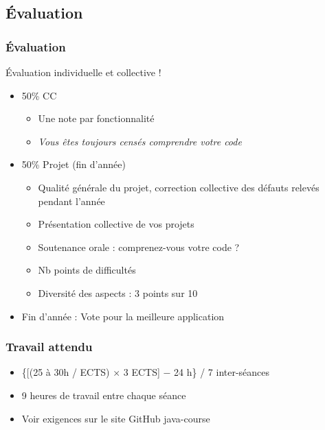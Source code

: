 \documentclass[english, french]{beamer}
\begin{document}
\subsection{Évaluation}
\begin{frame}
	\frametitle{Évaluation}
	 Évaluation individuelle et collective !
	\begin{itemize}
		\item 50\% CC
		\begin{itemize}
			\item Une note par fonctionnalité
			\item \emph{Vous êtes toujours censés comprendre votre code}
		\end{itemize}
		\item 50\% Projet (fin d’année)
		\begin{itemize}
			\item Qualité générale du projet, correction collective des défauts relevés pendant l’année
			\item Présentation collective de vos projets
			\item Soutenance orale : comprenez-vous votre code ?
			\item Nb points de difficultés
			\item Diversité des aspects : 3 points sur 10
		\end{itemize}
		\item Fin d’année : Vote pour la meilleure application
	\end{itemize}
\end{frame}

\begin{frame}
	\frametitle{Travail attendu}
	\begin{itemize}
		\item \{[(25 à 30h / ECTS) × 3 ECTS] − 24 h\} / 7 inter-séances
		\item 9 heures de travail entre chaque séance
		\item Voir exigences sur le site GitHub java-course
	\end{itemize}
\end{frame}
\end{document}
